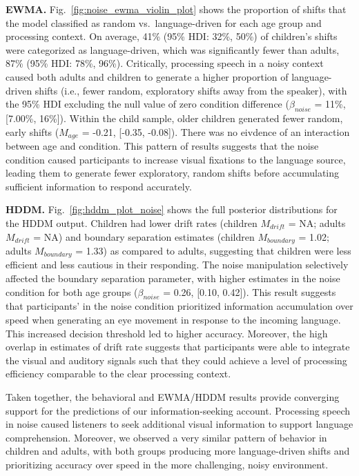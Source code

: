 \documentclass[english,floatsintext,man]{apa6}
\theoremstyle{definition}
\theoremstyle{definition}
\theoremstyle{definition}
\theoremstyle{remark}
\begin{document}
\textbf{EWMA.} Fig.~\ref{fig:noise_ewma_violin_plot} shows the
proportion of shifts that the model classified as random
vs.~language-driven for each age group and processing context. On
average, 41\% (95\% HDI: 32\%, 50\%) of children's shifts were
categorized as language-driven, which was significantly fewer than
adults, 87\% (95\% HDI: 78\%, 96\%). Critically, processing speech in a
noisy context caused both adults and children to generate a higher
proportion of language-driven shifts (i.e., fewer random, exploratory
shifts away from the speaker), with the 95\% HDI excluding the null
value of zero condition difference (\(\beta_{noise}\) = 11\%, {[}7.00\%,
16\%{]}). Within the child sample, older children generated fewer
random, early shifts (\(M_{age}\) = -0.21, {[}-0.35, -0.08{]}). There
was no eivdence of an interaction between age and condition. This
pattern of results suggests that the noise condition caused participants
to increase visual fixations to the language source, leading them to
generate fewer exploratory, random shifts before accumulating sufficient
information to respond accurately.

\textbf{HDDM.} Fig.~\ref{fig:hddm_plot_noise} shows the full posterior
distributions for the HDDM output. Children had lower drift rates
(children \(M_{drift}\) = NA; adults \(M_{drift}\) = NA) and boundary
separation estimates (children \(M_{boundary}\) = 1.02; adults
\(M_{boundary}\) = 1.33) as compared to adults, suggesting that children
were less efficient and less cautious in their responding. The noise
manipulation selectively affected the boundary separation parameter,
with higher estimates in the noise condition for both age groups
(\(\beta_{noise}\) = 0.26, {[}0.10, 0.42{]}). This result suggests that
participants' in the noise condition prioritized information
accumulation over speed when generating an eye movement in response to
the incoming language. This increased decision threshold led to higher
accuracy. Moreover, the high overlap in estimates of drift rate suggests
that participants were able to integrate the visual and auditory signals
such that they could achieve a level of processing efficiency comparable
to the clear processing context.

Taken together, the behavioral and EWMA/HDDM results provide converging
support for the predictions of our information-seeking account.
Processing speech in noise caused listeners to seek additional visual
information to support language comprehension. Moreover, we observed a
very similar pattern of behavior in children and adults, with both
groups producing more language-driven shifts and prioritizing accuracy
over speed in the more challenging, noisy environment.
\end{document}
